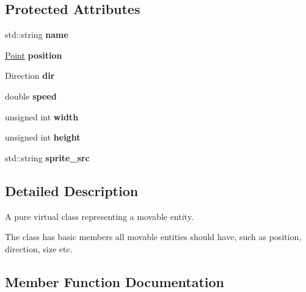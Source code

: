 \subsection*{Protected Attributes}
\begin{DoxyCompactItemize}
\item 
\mbox{\label{classEntity_a931b21fbdebb1a5963b4bcab5df128f5}} 
std\+::string {\bfseries name}
\item 
\mbox{\label{classEntity_a0fa3249cb9d74341cbd1343ef735e741}} 
\hyperlink{structPoint}{Point} {\bfseries position}
\item 
\mbox{\label{classEntity_a1376f94e972719f8153716ccfda85c6f}} 
Direction {\bfseries dir}
\item 
\mbox{\label{classEntity_a98572d956beb757675259e55bf79d5fd}} 
double {\bfseries speed}
\item 
\mbox{\label{classEntity_ac5e09232fb967bf716cc6e6684d32cea}} 
unsigned int {\bfseries width}
\item 
\mbox{\label{classEntity_aebf02bb745e69e68f44d5b5cee318d97}} 
unsigned int {\bfseries height}
\item 
\mbox{\label{classEntity_a998573f778e41028ebae46d195314ab9}} 
std\+::string {\bfseries sprite\+\_\+src}
\end{DoxyCompactItemize}


\subsection{Detailed Description}
A pure virtual class representing a movable entity. 

The class has basic members all movable entities should have, such as position, direction, size etc. 

\subsection{Member Function Documentation}
\mbox{\label{classEntity_a6a8f776c063333b5756e720d9b6dfeac}} 
